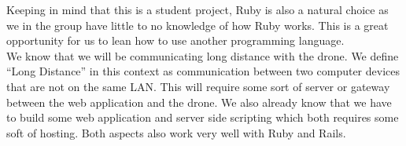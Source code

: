 
Keeping in mind that this is a student project, Ruby is also a natural choice as we in the group have little to no knowledge of how Ruby works.
This is a great opportunity for us to lean how to use another programming language. \\

We know that we will be communicating long distance with the drone.
We define ``Long Distance'' in this context as communication between two computer devices that are not on the same LAN.
This will require some sort of server or gateway between the web application and the drone.
We also already know that we have to build some web application and server side scripting which both requires some soft of hosting.
Both aspects also work very well with Ruby and Rails.




